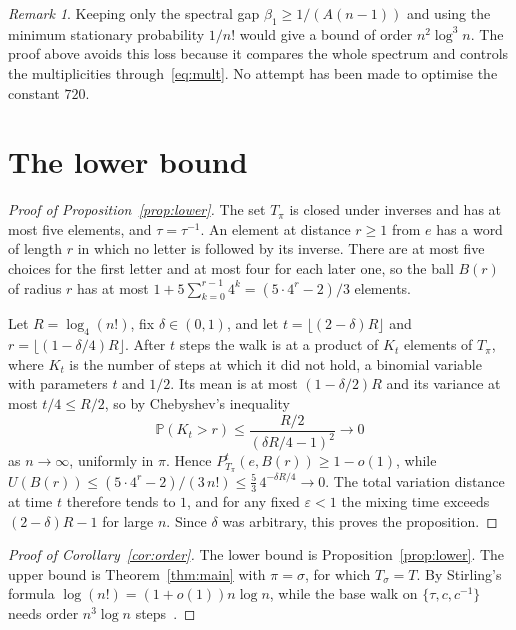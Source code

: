 \documentclass[11pt]{amsart}
\theoremstyle{remark}
\newtheorem{remark}[theorem]{Remark}
\numberwithin{equation}{section}
\begin{document}
\begin{remark}
Keeping only the spectral gap $\beta_1\ge 1/(A(n-1))$ and using the minimum stationary probability $1/n!$ would give a bound of order $n^2\log^3 n$. The proof above avoids this loss because it compares the whole spectrum and controls the multiplicities through~\eqref{eq:mult}. No attempt has been made to optimise the constant $720$.
\end{remark}

\section{The lower bound}\label{sec:lower}

\begin{proof}[Proof of Proposition~\ref{prop:lower}]
The set $T_\pi$ is closed under inverses and has at most five elements, and $\tau=\tau^{-1}$. An element at distance $r\ge1$ from $e$ has a word of length $r$ in which no letter is followed by its inverse. There are at most five choices for the first letter and at most four for each later one, so the ball $B(r)$ of radius $r$ has at most $1+5\sum_{k=0}^{r-1}4^k=(5\cdot4^r-2)/3$ elements.

Let $R=\log_4(n!)$, fix $\delta\in(0,1)$, and let $t=\lfloor(2-\delta)R\rfloor$ and $r=\lfloor(1-\delta/4)R\rfloor$. After $t$ steps the walk is at a product of $K_t$ elements of $T_\pi$, where $K_t$ is the number of steps at which it did not hold, a binomial variable with parameters $t$ and $1/2$. Its mean is at most $(1-\delta/2)R$ and its variance at most $t/4\le R/2$, so by Chebyshev's inequality
\[
 \mathbb P(K_t>r)\le\frac{R/2}{(\delta R/4-1)^2}\to0
\]
as $n\to\infty$, uniformly in $\pi$. Hence $P_{T_\pi}^t(e,B(r))\ge1-o(1)$, while $U(B(r))\le(5\cdot4^r-2)/(3\,n!)\le\tfrac53\,4^{-\delta R/4}\to0$. The total variation distance at time $t$ therefore tends to $1$, and for any fixed $\varepsilon<1$ the mixing time exceeds $(2-\delta)R-1$ for large $n$. Since $\delta$ was arbitrary, this proves the proposition.
\end{proof}

\begin{proof}[Proof of Corollary~\ref{cor:order}]
The lower bound is Proposition~\ref{prop:lower}. The upper bound is Theorem~\ref{thm:main} with $\pi=\sigma$, for which $T_\sigma=T$. By Stirling's formula $\log(n!)=(1+o(1))n\log n$, while the base walk on $\{\tau,c,c^{-1}\}$ needs order $n^3\log n$ steps~\cite{DSC,Wilson}.
\end{proof}
\end{document}
